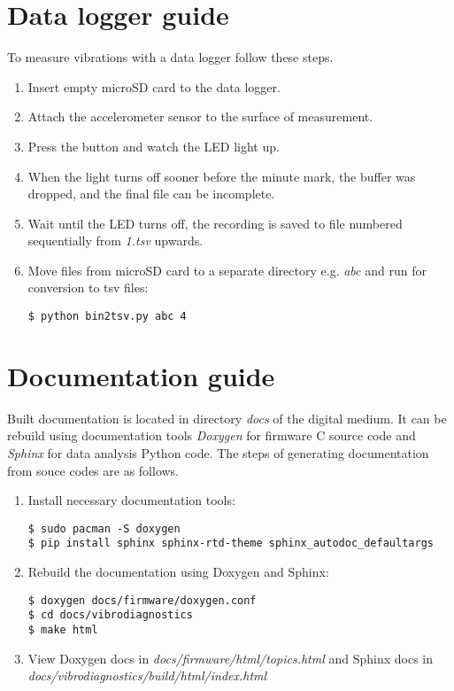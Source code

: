 \section{Data logger guide}
To measure vibrations with a data logger follow these steps.

\begin{enumerate}[noitemsep]
\item Insert empty microSD card to the data logger.
\item Attach the accelerometer sensor to the surface of measurement.
\item Press the button and watch the LED light up.
\item When the light turns off sooner before the minute mark, the buffer was dropped, and the final file can be incomplete.
\item Wait until the LED turns off, the recording is saved to file numbered sequentially from \emph{1.tsv} upwards.
\item {Move files from microSD card to a separate directory e.g. \emph{abc} and run for conversion to tsv files:
\begin{lstlisting}[style=messages]
$ python bin2tsv.py abc 4
\end{lstlisting}}
\end{enumerate}


\section{Documentation guide}
Built documentation is located in directory \emph{docs} of the digital medium. It can be rebuild using documentation tools \emph{Doxygen} for firmware C source code and \emph{Sphinx} for data analysis Python code. The steps of generating documentation from souce codes are as follows.

\begin{enumerate}[noitemsep]
\item {Install necessary documentation tools:
\begin{lstlisting}[style=messages]
$ sudo pacman -S doxygen
$ pip install sphinx sphinx-rtd-theme sphinx_autodoc_defaultargs
\end{lstlisting}}
\item {Rebuild the documentation using Doxygen and Sphinx:
\begin{lstlisting}[style=messages]
$ doxygen docs/firmware/doxygen.conf
$ cd docs/vibrodiagnostics
$ make html
\end{lstlisting}}
\item {View Doxygen docs in \emph{docs/firmware/html/topics.html} and Sphinx docs in \emph{docs/vibrodiagnostics/build/html/index.html}}
\end{enumerate}
